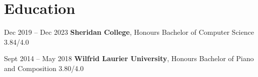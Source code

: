 \vspace{5 pt - 0.9 cm}
\section{Education}
\begin{twocolentry}{
    Dec 2019 – Dec 2023
}
\vspace{0.10 cm}
\textbf{Sheridan College}, Honours Bachelor of Computer Science 3.84/4.0\end{twocolentry}

\begin{twocolentry}{
    Sept 2014 – May 2018
}
\vspace{0.10 cm}
\textbf{Wilfrid Laurier University}, Honours Bachelor of Piano and Composition 3.80/4.0\end{twocolentry}